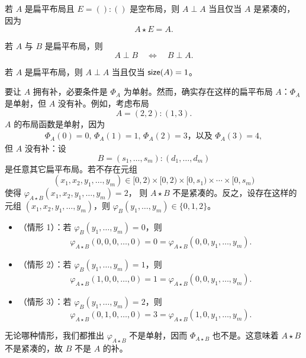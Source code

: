 \begin{example}
    若 $A$ 是扁平布局且 $E = ():()$ 是空布局，则 $A \perp A$ 当且仅当 $A$ 是紧凑的，因为
    \[
    A \star E = A.
    \]
\end{example}

\begin{example}
    若 $A$ 与 $B$ 是扁平布局，则
    \[A \perp B \quad \Leftrightarrow \quad B \perp A.\]
\end{example}

\begin{example}
    若 $A$ 是扁平布局，则 $A\perp A$ 当且仅当 $\mathsf{size}(A) = 1$。
\end{example}

\begin{observation}
    要让 $A$ 拥有补，必要条件是 $\Phi_A$ 为单射。然而，确实存在这样的扁平布局 $A$：$\Phi_A$ 是单射，但 $A$ 没有补。例如，考虑布局
    \[
    A = (2,2):(1,3).
    \]
    $A$ 的布局函数是单射，因为
    \begin{align*}
    \Phi_A(0) = 0\text{, }\Phi_A(1) = 1\text{, } \Phi_A(2) = 3\text{，以及 }\Phi_A(3) = 4,
    \end{align*}
    但 $A$ 没有补：设
    \[
    B = (s_1,\dots,s_m):(d_1,\dots,d_m)
    \]
    是任意其它扁平布局。若不存在元组
    \[
    (x_1,x_2,y_1,\dots,y_m) \in [0,2) \times [0,2) \times [0,s_1) \times \cdots \times  [0,s_m)
    \]
    使得 $\varphi_{A \star B}(x_1,x_2,y_1,\dots,y_m) = 2$，
    则 $A \star B$ 不是紧凑的。反之，设存在这样的元组 $(x_1,x_2,y_1,\dots,y_m)$，则 $\varphi_{B}(y_1,\dots,y_m) \in \{0,1,2\}$。
    \begin{itemize}
        \item （情形 1）：若 $\varphi_{B}(y_1,\dots,y_m) = 0$，则
        \begin{align*}
        \varphi_{A \star B}(0,0,0,\dots,0) = 0 = \varphi_{A \star B}(0,0,y_1,\dots,y_m).
        \end{align*}
        \item （情形 2）：若 $\varphi_{B}(y_1,\dots,y_m) = 1$，则
        \begin{align*}
        \varphi_{A \star B}(1,0,0,\dots,0) = 1 = \varphi_{A \star B}(0,0,y_1,\dots,y_m).
        \end{align*}
        \item （情形 3）：若 $\varphi_{B}(y_1,\dots,y_m) = 2$，则
        \[
        \varphi_{A \star B}(0,1,0,\dots,0) = 3 = \varphi_{A \star B}(1,0,y_1,\dots,y_m).
        \]
    \end{itemize}
    无论哪种情形，我们都推出 $\varphi_{A\star B}$ 不是单射，因而 $\Phi_{A \star B}$ 也不是。这意味着 $A \star B$ 不是紧凑的，故 $B$ 不是 $A$ 的补。
\end{observation}

